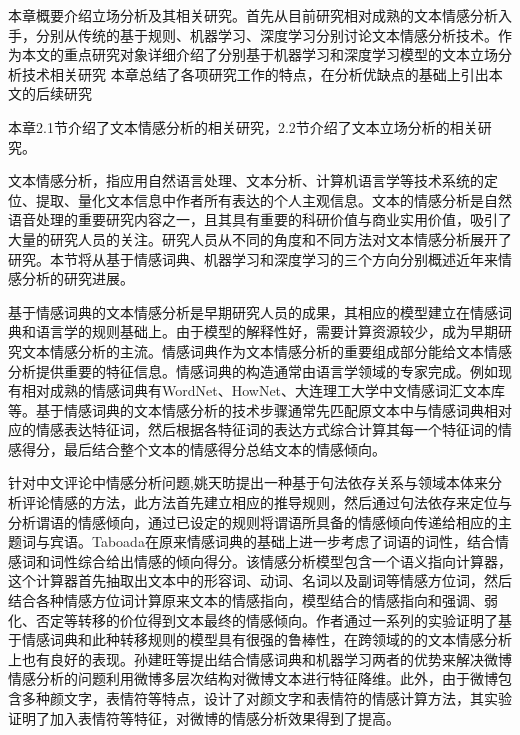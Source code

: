 

本章概要介绍立场分析及其相关研究。首先从目前研究相对成熟的文本情感分析入手，分别从传统的基于规则、机器学习、深度学习分别讨论文本情感分析技术。作为本文的重点研究对象详细介绍了分别基于机器学习和深度学习模型的文本立场分析技术相关研究 本章总结了各项研究工作的特点，在分析优缺点的基础上引出本文的后续研究

本章2.1节介绍了文本情感分析的相关研究，2.2节介绍了文本立场分析的相关研究。


文本情感分析，指应用自然语言处理、文本分析、计算机语言学等技术系统的定位、提取、量化文本信息中作者所有表达的个人主观信息。文本的情感分析是自然语音处理的重要研究内容之一，且其具有重要的科研价值与商业实用价值，吸引了大量的研究人员的关注。研究人员从不同的角度和不同方法对文本情感分析展开了研究。本节将从基于情感词典、机器学习和深度学习的三个方向分别概述近年来情感分析的研究进展。


基于情感词典的文本情感分析是早期研究人员的成果，其相应的模型建立在情感词典和语言学的规则基础上。由于模型的解释性好，需要计算资源较少，成为早期研究文本情感分析的主流。情感词典作为文本情感分析的重要组成部分能给文本情感分析提供重要的特征信息。情感词典的构造通常由语言学领域的专家完成。例如现有相对成熟的情感词典有WordNet、HowNet、大连理工大学中文情感词汇文本库等。基于情感词典的文本情感分析的技术步骤通常先匹配原文本中与情感词典相对应的情感表达特征词，然后根据各特征词的表达方式综合计算其每一个特征词的情感得分，最后结合整个文本的情感得分总结文本的情感倾向。

针对中文评论中情感分析问题,姚天昉提出一种基于句法依存关系与领域本体来分析评论情感的方法，此方法首先建立相应的推导规则，然后通过句法依存来定位与分析谓语的情感倾向，通过已设定的规则将谓语所具备的情感倾向传递给相应的主题词与宾语。Taboada在原来情感词典的基础上进一步考虑了词语的词性，结合情感词和词性综合给出情感的倾向得分。该情感分析模型包含一个语义指向计算器，这个计算器首先抽取出文本中的形容词、动词、名词以及副词等情感方位词，然后结合各种情感方位词计算原来文本的情感指向，模型结合的情感指向和强调、弱化、否定等转移的价位得到文本最终的情感倾向。作者通过一系列的实验证明了基于情感词典和此种转移规则的模型具有很强的鲁棒性，在跨领域的的文本情感分析上也有良好的表现。孙建旺等提出结合情感词典和机器学习两者的优势来解决微博情感分析的问题利用微博多层次结构对微博文本进行特征降维。此外，由于微博包含多种颜文字，表情符等特点，设计了对颜文字和表情符的情感计算方法，其实验证明了加入表情符等特征，对微博的情感分析效果得到了提高。

